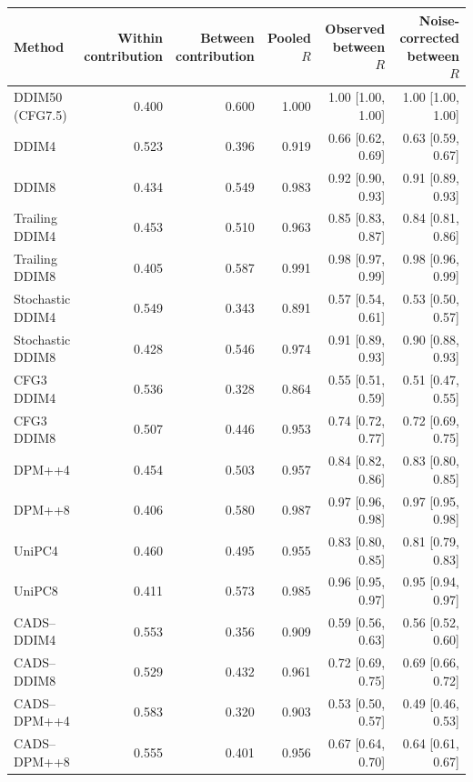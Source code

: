 \begin{table}[t]
\centering\footnotesize
\setlength{\tabcolsep}{4pt}
\begin{tabular}{lrrrrr}
\toprule
Method & \shortstack{Within\\contribution} & \shortstack{Between\\contribution} & \shortstack{Pooled\\$R$} & \shortstack{Observed\\between $R$} & \shortstack{Noise-corrected\\between $R$} \\
\midrule
DDIM50 (CFG7.5) & 0.400 & 0.600 & 1.000 & 1.00 [1.00, 1.00] & 1.00 [1.00, 1.00] \\
DDIM4 & 0.523 & 0.396 & 0.919 & 0.66 [0.62, 0.69] & 0.63 [0.59, 0.67] \\
DDIM8 & 0.434 & 0.549 & 0.983 & 0.92 [0.90, 0.93] & 0.91 [0.89, 0.93] \\
Trailing DDIM4 & 0.453 & 0.510 & 0.963 & 0.85 [0.83, 0.87] & 0.84 [0.81, 0.86] \\
Trailing DDIM8 & 0.405 & 0.587 & 0.991 & 0.98 [0.97, 0.99] & 0.98 [0.96, 0.99] \\
Stochastic DDIM4 & 0.549 & 0.343 & 0.891 & 0.57 [0.54, 0.61] & 0.53 [0.50, 0.57] \\
Stochastic DDIM8 & 0.428 & 0.546 & 0.974 & 0.91 [0.89, 0.93] & 0.90 [0.88, 0.93] \\
CFG3 DDIM4 & 0.536 & 0.328 & 0.864 & 0.55 [0.51, 0.59] & 0.51 [0.47, 0.55] \\
CFG3 DDIM8 & 0.507 & 0.446 & 0.953 & 0.74 [0.72, 0.77] & 0.72 [0.69, 0.75] \\
DPM++4 & 0.454 & 0.503 & 0.957 & 0.84 [0.82, 0.86] & 0.83 [0.80, 0.85] \\
DPM++8 & 0.406 & 0.580 & 0.987 & 0.97 [0.96, 0.98] & 0.97 [0.95, 0.98] \\
UniPC4 & 0.460 & 0.495 & 0.955 & 0.83 [0.80, 0.85] & 0.81 [0.79, 0.83] \\
UniPC8 & 0.411 & 0.573 & 0.985 & 0.96 [0.95, 0.97] & 0.95 [0.94, 0.97] \\
CADS--DDIM4 & 0.553 & 0.356 & 0.909 & 0.59 [0.56, 0.63] & 0.56 [0.52, 0.60] \\
CADS--DDIM8 & 0.529 & 0.432 & 0.961 & 0.72 [0.69, 0.75] & 0.69 [0.66, 0.72] \\
CADS--DPM++4 & 0.583 & 0.320 & 0.903 & 0.53 [0.50, 0.57] & 0.49 [0.46, 0.53] \\
CADS--DPM++8 & 0.555 & 0.401 & 0.956 & 0.67 [0.64, 0.70] & 0.64 [0.61, 0.67] \\

\end{tabular}
\end{table}
